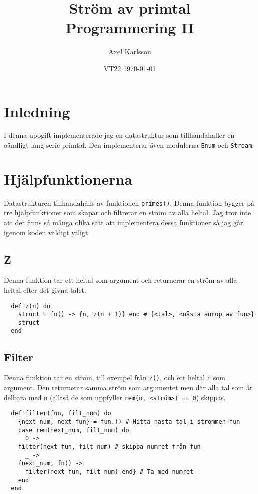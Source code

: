 \documentclass[a4paper,11pt]{article}
\begin{document}
\title{
  \textbf{Ström av primtal\\
  \small Programmering II}
}
\author{Axel Karlsson}
\date{VT22 \today}

\maketitle

\section*{Inledning}
I denna uppgift implementerade jag en datastruktur som tillhandahåller en oändligt lång serie primtal. Den implementerar även modulerna {\tt Enum} och {\tt Stream}.

\section*{Hjälpfunktionerna}
Datastrukturen tillhandahålls av funktionen {\tt primes()}. Denna funktion bygger på tre hjälpfunktioner som skapar och filtrerar en ström av alla heltal. Jag tror inte att det finns så många olika sätt att implementera dessa funktioner så jag går igenom koden väldigt ytligt.
\subsection*{Z}
Denna funktion tar ett heltal som argument och returnerar en ström av alla heltal efter det givna talet.
\begin{verbatim}
  def z(n) do
    struct = fn() -> {n, z(n + 1)} end # {<tal>, <nästa anrop av fun>}
    struct
  end
\end{verbatim}

\subsection*{Filter}
Denna funktion tar en ström, till exempel från {\tt z()}, och ett heltal {\tt n} som argument. Den returnerar samma ström som argumentet men där alla tal som är delbara med {\tt n} (alltså de som uppfyller {\tt rem(n, <ström>) == 0}) skippas.
\begin{verbatim}
  def filter(fun, filt_num) do
    {next_num, next_fun} = fun.() # Hitta nästa tal i strömmen fun
    case rem(next_num, filt_num) do
      0 ->
	filter(next_fun, filt_num) # skippa numret från fun
      _ ->
	{next_num, fn() ->
	  filter(next_fun, filt_num) end} # Ta med numret
    end
  end
\end{verbatim}
\end{document}
